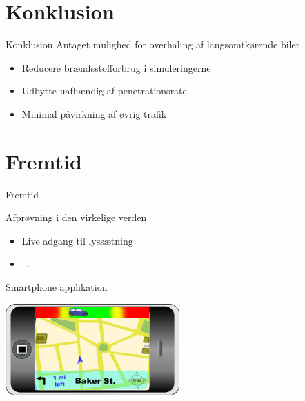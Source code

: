 \section{Konklusion}
\begin{frame}{Konklusion}
Antaget mulighed for overhaling af langsomtkørende biler
\begin{itemize}
\item Reducere brændsstofforbrug i simuleringerne
\item Udbytte uafhændig af penetrationsrate
\item Minimal påvirkning af øvrig trafik
\end{itemize}
\end{frame}

\section{Fremtid}
\begin{frame}{Fremtid}

Afprøvning i den virkelige verden %
\begin{itemize}
\item Live adgang til lyssætning
\item ...
\end{itemize}

Smartphone applikation
\begin{center}
\includegraphics[width=0.5\textwidth]{images/product.png}
\end{center}
\end{frame}
